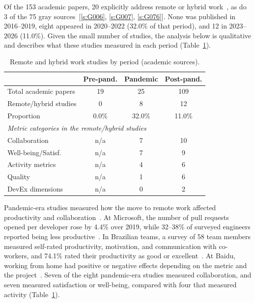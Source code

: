 \documentclass[preprint,number]{elsarticle}
\newcommand{\refG}[1]{\ref{s:#1}}
\begin{document}
Of the 153 academic papers, 20 explicitly address remote or hybrid work~\cite{P0001, P0027, P0181, P0184, P0473, P0551, P0611, P1259, P1280, P1503, P2021, P2056, P2068, P2083, P2086, P2112, P2115, P2125, P2130, P2132}, as do 3 of the 75 gray sources~[\refG{G006}, \refG{G007}, \refG{G076}]. None was published in 2016--2019, eight appeared in 2020--2022 (32.0\% of that period), and 12 in 2023--2026 (11.0\%). Given the small number of studies, the analysis below is qualitative and describes what these studies measured in each period (Table~\ref{tab:remote}).

\begin{table}[htbp]
\centering
\caption{Remote and hybrid work studies by period (academic sources).}
\label{tab:remote}
\footnotesize
\begin{tabular}{l c c c}
\toprule
 & \textbf{Pre-pand.} & \textbf{Pandemic} & \textbf{Post-pand.} \\
\midrule
Total academic papers  & 19 & 25 & 109 \\
Remote/hybrid studies  & 0  & 8  & 12  \\
Proportion             & 0.0\% & 32.0\% & 11.0\% \\
\midrule
\multicolumn{4}{l}{\textit{Metric categories in the remote/hybrid studies}} \\
\quad Collaboration     & n/a & 7 & 10 \\
\quad Well-being/Satisf. & n/a & 7 & 9 \\
\quad Activity metrics  & n/a & 4 & 6 \\
\quad Quality           & n/a & 1 & 6 \\
\quad DevEx dimensions  & n/a & 0 & 2 \\
\bottomrule
\end{tabular}
\end{table}

Pandemic-era studies measured how the move to remote work affected productivity and collaboration~\cite{P1503, P2130, P2132}. At Microsoft, the number of pull requests opened per developer rose by 4.4\% over 2019, while 32--38\% of surveyed engineers reported being less productive~\cite{P2132}. In Brazilian teams, a survey of 58 team members measured self-rated productivity, motivation, and communication with co-workers, and 74.1\% rated their productivity as good or excellent~\cite{P2130}. At Baidu, working from home had positive or negative effects depending on the metric and the project~\cite{P0611}. Seven of the eight pandemic-era studies measured collaboration, and seven measured satisfaction or well-being, compared with four that measured activity (Table~\ref{tab:remote}).
\end{document}
